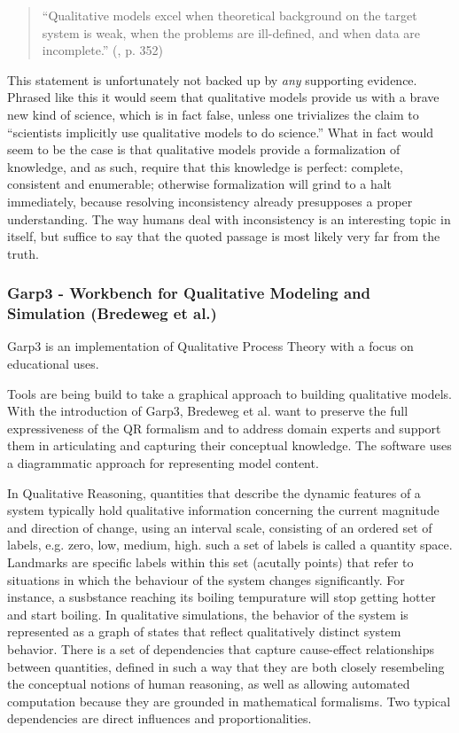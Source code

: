 \documentclass{article} %
\begin{document}
	\begin{quote}
	``Qualitative models excel when theoretical background on the target
	system is weak, when the problems are ill-defined, and when data are
	incomplete.'' (\cite{bredeweg-eco}, p. 352)
	\end{quote}

This statement is unfortunately not backed up by {\em any} supporting evidence.
Phrased like this it would seem that qualitative models provide us with a brave
new kind of science, which is in fact false, unless one trivializes the claim
to ``scientists implicitly use qualitative models to do science.'' What in fact
would seem to be the case is that qualitative models provide a formalization
of knowledge, and as such, require that this knowledge is perfect: complete,
consistent and enumerable; otherwise formalization will grind to a halt
immediately, because resolving inconsistency already presupposes a proper
understanding. The way humans deal with inconsistency is an interesting topic
in itself, but suffice to say that the quoted passage is most likely very far
from the truth.

\subsubsection{Garp3 - Workbench for Qualitative Modeling and Simulation
(Bredeweg et al.)}
\label{sec:litrev_qr_garp}
Garp3 is an implementation of Qualitative Process Theory with a focus on
educational uses.

Tools are being build to take a graphical approach to building qualitative 
models. With the introduction of Garp3, Bredeweg et al. want to preserve the
full expressiveness of the QR formalism and to address domain experts and
support them in articulating and capturing their conceptual knowledge. The
software uses a diagrammatic approach for representing model content.

In Qualitative Reasoning, quantities that describe the dynamic features of a 
system typically hold qualitative information concerning the current magnitude 
and direction of change, using an interval scale, consisting of an ordered set 
of labels, e.g. {zero, low, medium, high}. such a set of labels
is called a quantity space. Landmarks are specific labels within this set
(acutally points) that refer to situations in which the behaviour of the system
changes significantly. For instance, a susbstance reaching its boiling
tempurature will stop getting hotter and start boiling. In qualitative
simulations, the behavior of the system is represented as a graph of states
that reflect qualitatively distinct system behavior. There is a set of
dependencies that capture cause-effect relationships between quantities,
defined in such a way that they are both closely resembeling the conceptual
notions of human reasoning, as well as allowing automated computation because
they are grounded in mathematical formalisms. Two typical dependencies are
direct influences and proportionalities.
\end{document}
